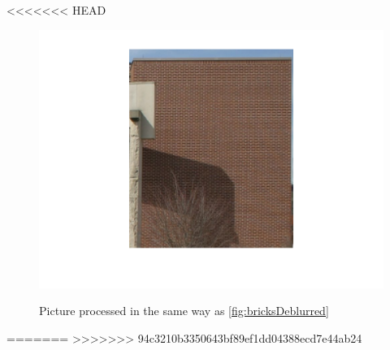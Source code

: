 <<<<<<< HEAD
\begin{figure}
\centering
\includegraphics[width=\textwidth]{../Images/bricksLanczos.png}
\label{fig:bricksLanczos}
\caption{Picture processed in the same way as \ref{fig:bricksDeblurred} }
\end{figure}
%



 
=======
%
>>>>>>> 94c3210b3350643bf89ef1dd04388ecd7e44ab24
